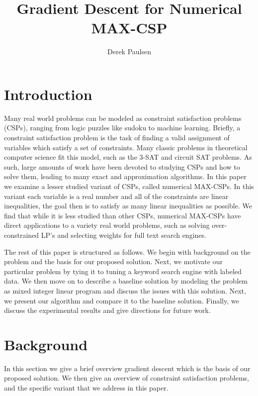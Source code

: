 \documentclass[a4paper]{article}
\title{Gradient Descent for Numerical MAX-CSP} %
\author{
Derek Paulsen \\
}
\date{}
\begin{document}
\maketitle 


\section{Introduction}


Many real world problems can be modeled as constraint satisfaction problems (CSPs),
ranging from logic puzzles like sudoku to machine learning. Briefly, a
constraint satisfaction problem is the task of finding a valid assignment of
variables which satisfy a set of constraints. Many classic problems in
theoretical computer science fit this model, such as the 3-SAT and circuit SAT
problems. As such, large amounts of work have been
devoted to studying CSPs and how to solve them, leading to many exact and
approximation algorithms.  In this paper we examine a lesser studied variant of
CSPs, called numerical MAX-CSPs. In this variant each variable is a real number
and all of the constraints are linear inequalities, the goal then is to satisfy
as many linear inequalities as possible. We find that while it is less
studied than other CSPs, numerical MAX-CSPs have direct applications to 
a variety real world problems, such as solving over-constrained LP's and 
selecting weights for full text search engines.

The rest of this paper is structured as follows. We begin with background
on the problem and the basis for our proposed solution. Next, we motivate our particular
problem by tying it to tuning a keyword search engine with labeled data. We
then move on to describe a baseline solution by modeling the problem as mixed
integer linear program and discuss the issues with this solution. Next, we
present our algorithm and compare it to the baseline solution. Finally, we
discuss the experimental results and give directions for future work.

\section{Background}

In this section we give a brief overview gradient descent which
is the basis of our proposed solution. We then give
an overview of constraint satisfaction problems,
and the specific variant that we address in this paper.
\end{document}
